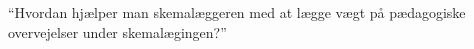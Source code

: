 ``Hvordan hjælper man skemalæggeren med at lægge vægt på pædagogiske overvejelser under skemalægingen?''